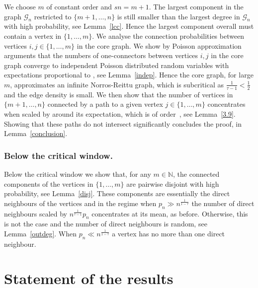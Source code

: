 \documentclass[12pt,a4paper]{article}
\numberwithin{equation}{section}
\begin{document}
We choose $m$ of constant order and $sn=m+1$.
The largest component in the graph $\mathscr G_n$ restricted to $\{m+1,\ldots,n\}$ is still smaller than the largest degree in  $\mathscr G_n$ with high probability, see Lemma~\ref{lcc}. Hence the largest component overall must contain a vertex in $\{1,\ldots,m\}$. 
We analyse the connection probabilities between vertices $i,j\in\{1,\dots,m\}$ in the core graph. We show by Poisson approximation arguments that the numbers of one-connectors between vertices $i,j$ in the core graph converge to independent Poisson distributed random variables with expectations proportional to 
, see Lemma~\ref{indep}.
Hence the core graph, for large $m$, approximates an infinite Norros-Reittu graph, which is subcritical as $\frac1{\tau-1}<\frac12$ and the edge density is small. %
We then show that the number of vertices in $\{m+1,\ldots,n\}$ connected by a path to a given vertex $j\in\{1,\dots,m\}$ concentrates when scaled by  around its expectation, which is of 
order~,
see Lemma~\ref{3.9}. Showing that these paths do not intersect significantly concludes the proof, in Lemma~\ref{conclusion}.

\subsubsection{Below the critical window.}

Below the critical window we show that, for any $m\in\mathbb N$, the connected components of the vertices in $\{1,\ldots, m\}$ are pairwise disjoint
with high probability, see Lemma~\ref{disj}. These components are essentially the direct neighbours of the vertices and
in the regime when $p_n\gg n^{\frac1{1-\tau}}$ the number of direct neighbours scaled by $n^{\frac1{\tau-1}}p_n$ concentrates at its mean,
as before. Otherwise, this is not the case and the number of direct neighbours is random, see Lemma~\ref{outdeg}. When  $p_n\ll n^{\frac1{1-\tau}}$ a vertex has no more than one direct neighbour.\pagebreak[3]


\section{Statement of the results}
\end{document}
